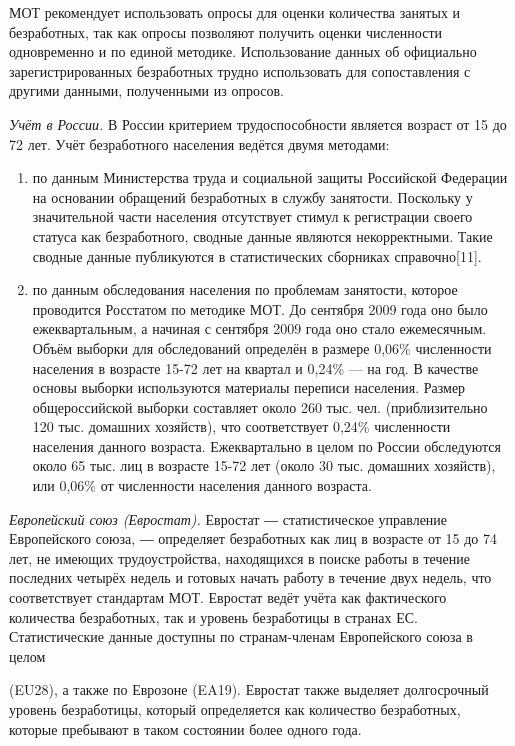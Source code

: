 МОТ рекомендует использовать опросы для оценки количества занятых и безработных, так как опросы позволяют получить оценки численности одновременно и по единой методике. Использование данных об официально зарегистрированных безработных трудно использовать для сопоставления с другими данными, полученными из опросов.

\textit{Учёт в России.} В России критерием трудоспособности является возраст от 15 до 72 лет. Учёт безработного населения ведётся двумя методами:
\begin{enumerate}
    \item по данным Министерства труда и социальной защиты Российской Федерации на основании обращений безработных в службу занятости. Поскольку у значительной части населения отсутствует стимул к регистрации своего статуса как безработного, сводные данные являются некорректными. Такие сводные данные публикуются в статистических сборниках справочно[11].
    \item по данным обследования населения по проблемам занятости, которое проводится Росстатом по методике МОТ. До сентября 2009 года оно было ежеквартальным, а начиная с сентября 2009 года оно стало ежемесячным. Объём выборки для обследований определён в размере 0,06\% численности населения в возрасте 15-72 лет на квартал и 0,24\% — на год. В качестве основы выборки используются материалы переписи населения. Размер общероссийской выборки составляет около 260 тыс. чел. (приблизительно 120 тыс. домашних хозяйств), что соответствует 0,24\% численности населения данного возраста. Ежеквартально в целом по России обследуются около 65 тыс. лиц в возрасте 15-72 лет (около 30 тыс. домашних хозяйств), или 0,06\% от численности населения данного возраста.
\end{enumerate}

\textit{Европейский союз (Евростат).}
Евростат ― статистическое управление Европейского союза, ― определяет безработных как лиц в возрасте от 15 до 74 лет, не имеющих трудоустройства, находящихся в поиске работы в течение последних четырёх недель и готовых начать работу в течение двух недель, что соответствует стандартам МОТ. Евростат ведёт учёта как фактического количества безработных, так и уровень безработицы в странах ЕС. Статистические данные доступны по странам-членам Европейского союза в целом

(EU28), а также по Еврозоне (EA19). Евростат также выделяет долгосрочный уровень безработицы, который определяется как количество безработных, которые пребывают в таком состоянии более одного года.

